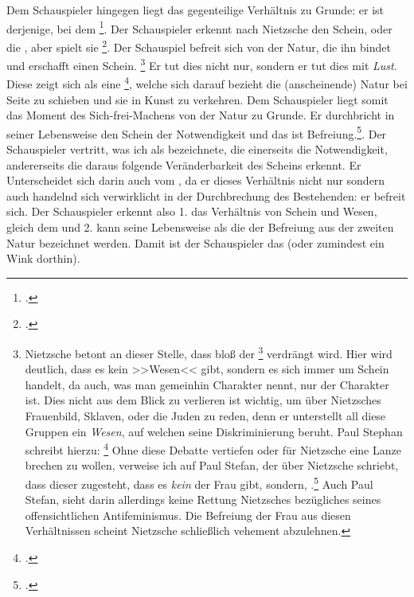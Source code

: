 \documentclass[12pt, a4paper, openany]{report}
\begin{document}
Dem Schauspieler hingegen liegt das gegenteilige Verhältnis zu Grunde: 
er ist derjenige, bei dem \footcite[][596]{nietzsche_morgenrote_1999}.
Der Schauspieler erkennt nach Nietzsche den Schein, oder die , aber spielt sie \footcite[][608]{nietzsche_morgenrote_1999}.
Der Schauspiel befreit sich von der Natur, die ihn bindet und erschafft einen Schein.%
\footnote{
    Nietzsche betont an dieser Stelle, dass bloß der \footcite[][608]{nietzsche_morgenrote_1999} verdrängt wird.
    Hier wird deutlich, dass es kein >>Wesen<< gibt, sondern es sich immer um Schein handelt, da auch, was man gemeinhin Charakter nennt, nur der  Charakter ist.
    Dies nicht aus dem Blick zu verlieren ist wichtig, um über Nietzsches Frauenbild, Sklaven, oder die Juden zu reden, denn er unterstellt all diese Gruppen ein \emph{Wesen}, auf welchen seine Diskriminierung beruht. 
    Paul Stephan schreibt hierzu: 
    \footcite[][61]{stephan_nietzscheanismus_2019}
    Ohne diese Debatte vertiefen oder für Nietzsche eine Lanze brechen zu wollen, verweise ich auf Paul Stefan, der über Nietzsche schriebt, dass dieser zugesteht, dass es \emph{kein}  der Frau gibt, sondern, .\footcite[Vgl.][50]{stephan_nietzscheanismus_2019} 
    Auch Paul Stefan, sieht darin allerdings keine Rettung Nietzsches bezügliches seines offensichtlichen Antifeminismus.
    Die Befreiung der Frau aus diesen Verhältnissen scheint Nietzsche schließlich vehement abzulehnen.
}
Er tut dies nicht nur, sondern er tut dies mit \emph{Lust}.
Diese  zeigt sich als eine \footcite[][608]{nietzsche_morgenrote_1999}, welche sich darauf bezieht die (anscheinende) Natur bei Seite zu schieben und sie in Kunst zu verkehren.
Dem Schauspieler liegt somit das Moment des Sich-frei-Machens von der Natur zu Grunde. 
Er durchbricht in seiner Lebensweise den Schein der Notwendigkeit und das ist Befreiung.\footcite[Vgl.][41]{menke_autonomie_2018}.
Der Schauspieler vertritt, was ich als  bezeichnete, die einerseits die Notwendigkeit, andererseits die daraus folgende Veränderbarkeit des Scheins erkennt.
Er Unterscheidet sich darin auch vom , da er dieses Verhältnis nicht nur  sondern auch handelnd sich verwirklicht in der Durchbrechung des Bestehenden: 
er befreit sich.
Der Schauspieler erkennt also 1. das Verhältnis von Schein und Wesen, gleich dem  und 2. kann seine Lebensweise als die der Befreiung aus der zweiten Natur bezeichnet werden. 
Damit ist der Schauspieler das  (oder zumindest ein Wink dorthin).
\\
\end{document}
